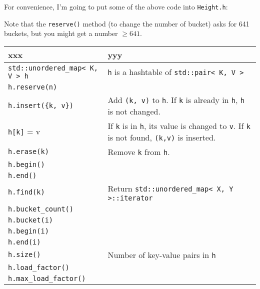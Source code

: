 For convenience, I'm going to put some of the above code
into \verb!Height.h!:


\vspace{-0.1cm}
{\small
{}
}

Note that the \verb!reserve()! method (to change the number of
bucket) asks for 641 buckets, but you might get a number $\geq 641$.






{\footnotesize
\begin{tabular}{|p{}|p{}|}
  \hline
  xxx  & yyy
  \\
  \hline \hline
  \texttt{std::unordered\_map< K, V > h} & \texttt{h} is a hashtable of \texttt{std::pair< K, V >} \\ \hline 
  \texttt{h.reserve(n)}                &                                                           \\ \hline 
  \texttt{h.insert(\{k, v\})}          & Add \texttt{(k, v)} to \texttt{h}. If \verb!k! is already in \verb!h!, \verb!h! is not changed. \\ \hline
  \texttt{h[k]} = v                    & If \verb!k! is in \verb!h!, its value is changed to \verb!v!. If \verb!k! is not found, \verb!(k,v)! is inserted. \\ \hline
  \texttt{h.erase(k)}                  & Remove \verb!k! from \verb!h!.                            \\ \hline
  \texttt{h.begin()}                   &                                                           \\ \hline
  \texttt{h.end()}                     &                                                           \\ \hline
  \texttt{h.find(k)}                   & Return \texttt{std::unordered\_map< X, Y >::iterator} \\ \hline
  \texttt{h.bucket\_count()}           &                                                           \\ \hline
  \texttt{h.bucket(i)}                 &                                                           \\ \hline
  \texttt{h.begin(i)}                  &                                                           \\ \hline

  \texttt{h.end(i)}                    &                                                           \\ \hline
  \texttt{h.size()}                    & Number of key-value pairs in \verb!h!                     \\ \hline
  \texttt{h.load\_factor()}            &                                                           \\ \hline
  \texttt{h.max\_load\_factor()}       &                                                           \\ \hline
\end{tabular}
}

